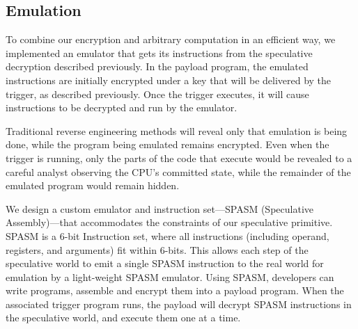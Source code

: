 \medskip


%
%


% 
% 

\subsection{Emulation}

To combine our encryption and arbitrary computation in an efficient way, we
implemented an emulator that gets its instructions from the speculative
decryption described previously. In the payload program, the emulated
instructions are initially encrypted under a key that will be delivered by the
trigger, as described previously. Once the trigger executes, it will cause
instructions to be decrypted and run by the emulator.

Traditional reverse engineering methods will reveal only that
emulation is being done, while the program being emulated remains encrypted.
Even when the trigger is running, only the parts of the code that execute would
be revealed to a careful analyst observing the CPU's committed state, while the
remainder of the emulated program would remain hidden.

We design a custom emulator and instruction set---SPASM (Speculative
Assembly)---that accommodates the constraints of our speculative primitive.
SPASM is a 6-bit Instruction set, where all instructions (including operand,
registers, and arguments) fit within 6-bits. This allows each step of the
speculative world to emit a single SPASM instruction to the real world for
emulation by a light-weight SPASM emulator. Using SPASM, developers can write
programs, assemble and encrypt them into a payload program. When the
associated trigger program runs, the payload will decrypt SPASM instructions in
the speculative world, and execute them one at a time.


